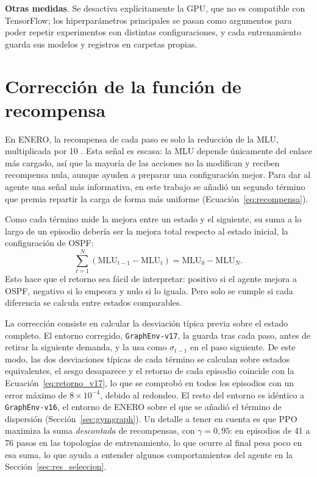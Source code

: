 \textbf{Otras medidas}. Se desactiva explícitamente la GPU, que no es compatible con TensorFlow; los hiperparámetros principales se pasan como argumentos para poder repetir experimentos con distintas configuraciones, y cada entrenamiento guarda sus modelos y registros en carpetas propias.

\section{Corrección de la función de recompensa}\label{sec:analisis_recompensa}

En ENERO, la recompensa de cada paso es solo la reducción de la MLU, multiplicada por 10 \cite{ALMASAN2022109166}. Esta señal es escasa: la MLU depende únicamente del enlace más cargado, así que la mayoría de las acciones no la modifican y reciben recompensa nula, aunque ayuden a preparar una configuración mejor. Para dar al agente una señal más informativa, en este trabajo se añadió un segundo término que premia repartir la carga de forma más uniforme (Ecuación~\eqref{eq:recompensa}).

Como cada término mide la mejora entre un estado y el siguiente, su suma a lo largo de un episodio debería ser la mejora total respecto al estado inicial, la configuración de OSPF:
\begin{equation}\label{eq:telescopica}
	\sum_{t=1}^{N} \left(\mathrm{MLU}_{t-1} - \mathrm{MLU}_{t}\right) = \mathrm{MLU}_0 - \mathrm{MLU}_N .
\end{equation}
Esto hace que el retorno sea fácil de interpretar: positivo si el agente mejora a OSPF, negativo si lo empeora y nulo si lo iguala. Pero solo se cumple si cada diferencia se calcula entre estados comparables.

La corrección consiste en calcular la desviación típica previa sobre el estado completo. El entorno corregido, \texttt{GraphEnv-v17}, la guarda tras cada paso, antes de retirar la siguiente demanda, y la usa como $\sigma_{t-1}$ en el paso siguiente. De este modo, las dos desviaciones típicas de cada término se calculan sobre estados equivalentes, el sesgo desaparece y el retorno de cada episodio coincide con la Ecuación~\eqref{eq:retorno_v17}, lo que se comprobó en todos los episodios con un error máximo de $8 \times 10^{-4}$, debido al redondeo. El resto del entorno es idéntico a \texttt{GraphEnv-v16}, el entorno de ENERO sobre el que se añadió el término de dispersión (Sección~\ref{sec:gymgraph}). Un detalle a tener en cuenta es que PPO maximiza la suma \textit{descontada} de recompensas, con $\gamma = 0{,}95$: en episodios de 41 a 76 pasos en las topologías de entrenamiento, lo que ocurre al final pesa poco en esa suma, lo que ayuda a entender algunos comportamientos del agente en la Sección~\ref{sec:res_seleccion}.


